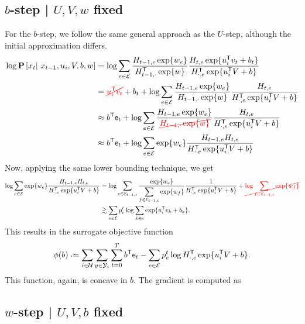 \documentclass{article}
\newcommand{\ccancel}[2][black]{\color{#1}\cancel{#2}\normalcolor}
\def\e{\ensuremath{\mathsf{e}}}
\def\E{\ensuremath{\mathcal{E}}}
\def\U{\ensuremath{\mathcal{U}}}
\begin{document}
\subsection{$b$-step | $U, V, w$ fixed}
For the $b$-step, we follow the same general approach as the $U$-step, although the initial approximation differs.
\begin{align}
\log\P\left[x_t \given x_{t-1}, u_i, V, b, w\right] 
&= \log\sum_{e\in \E} \frac{H_{t-1,e} \exp\{w_e\} }{H_{t-1,\cdot}\trans \exp\{w\}} \frac{H_{t,e} \exp\{u_i\trans v_t + b_t \} }{H_{\cdot,e}\trans \exp\{u_i\trans V + b \} }\notag\\
&= \ccancel[red]{u_i\trans v_t} + b_t + \log\sum_{e\in \E} \frac{H_{t-1,e}\exp\{w_e\} }{H_{t-1,\cdot}\exp\{w\}}\frac{H_{t, e}}{H_{\cdot,e}\trans \exp\{u_i\trans V + b \} }\notag\\
&\approx b\trans \e_t + \log\sum_{e\in \E} \frac{H_{t-1,e} \exp\{w_e\}}{\ccancel[red]{H_{t-1,\cdot} \exp\{w\} }}\frac{ H_{t,e} }{H_{\cdot,e}\trans \exp\{u_i\trans V + b \} }\notag\\
&\approx b\trans \e_t + \log\sum_{e\in \E} \exp\{w_e\} \frac{ H_{t-1,e} H_{t,e} }{H_{\cdot,e}\trans \exp\{u_i\trans V + b \} }\notag\\
\end{align}
Now, applying the same lower bounding technique, we get 
\begin{align}
\log\sum_{e\in \E} \exp\{w_e\} \frac{ H_{t-1,e} H_{t,e} }{H_{\cdot,e}\trans \exp\{u_i\trans V + b \} }
&=
\log\sum_{e\in \E_{t-1,t}} \frac{\exp\{w_e\}}{\displaystyle\sum_{f\in \E_{t-1,t}}\exp\{w_f\}} \frac{ 1 }{H_{\cdot,e}\trans \exp\{u_i\trans V + b \} } + \ccancel[red]{\log\sum_{f\in\E_{t-1,t}}
\exp\{w_f\}}\notag\\
&\gtrsim \sum_{e\in\E} p_e^t \log \sum_{k\in e} \exp\{u_i\trans v_k + b_k\}\label{eq:bstep:concave}.
\end{align}
This results in the surrogate objective function
\begin{equation}
\phi(b) \defeq \sum_{i\in\U}\sum_{y\in\Y_i}\sum_{t=0}^T b\trans \e_t - \sum_{e\in\E} p_e^t \log H_{\cdot, e}\trans \exp\{u_i\trans V + b\}.\label{eq:bstep:surrogate}
\end{equation}
This function, again, is concave in $b$.  The gradient is computed as
\subsection{$w$-step | $U, V, b$ fixed}
\end{document}
